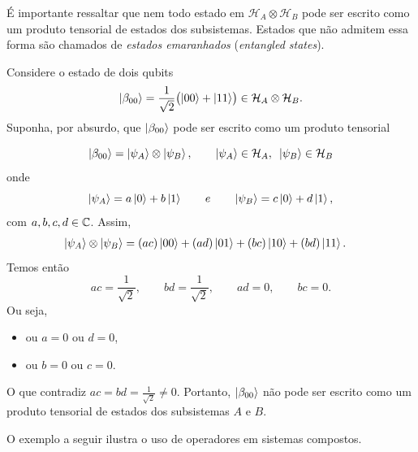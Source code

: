 É importante ressaltar que nem todo estado em $\mathcal{H}_A \otimes \mathcal{H}_B$ pode ser escrito como um
produto tensorial de estados dos subsistemas. Estados que não admitem essa forma
são chamados de \emph{estados emaranhados} (\emph{entangled states}).

\begin{example}
Considere o estado de dois qubits
\begin{equation}
\ket{\beta_{00}}=\frac{1}{\sqrt{2}}\bigl(\ket{00} + \ket{11}\bigr)
\in \mathcal{H}_A \otimes \mathcal{H}_B.
\end{equation}
Suponha, por absurdo, que $\ket{\beta_{00}}$ pode ser escrito como um produto tensorial

\begin{equation}
    \ket{\beta_{00}} = \ket{\psi_A} \otimes \ket{\psi_B}, \qquad \ket{\psi_A} \in \mathcal{H}_A, \text{ } \ket{\psi_B} \in \mathcal{H}_B
\end{equation}
onde
\begin{equation}
    \ket{\psi_A} = a\ket{0} + b\ket{1} \qquad e \qquad \ket{\psi_B} = c\ket{0} + d\ket{1},
\end{equation}
com $a,b,c,d \in \mathbb{C}$. Assim,
\begin{align}
    \ket{\psi_A} \otimes \ket{\psi_B}
    &= (ac)\ket{00} + (ad)\ket{01} + (bc)\ket{10} + (bd)\ket{11}.
\end{align}
Temos então
\begin{equation}
    ac = \frac{1}{\sqrt{2}}, \qquad bd = \frac{1}{\sqrt{2}}, \qquad ad = 0, \qquad bc = 0.    
\end{equation}
Ou seja,
\begin{itemize}
    \item ou $a=0$ ou $d=0$,
    \item ou $b=0$ ou $c=0$.
\end{itemize}
O que contradiz $ac=bd=\frac{1}{\sqrt{2}}\neq 0$. Portanto, $\ket{\beta_{00}}$ não pode ser escrito como um produto tensorial de estados dos subsistemas $A$ e $B$.
\end{example}

O exemplo a seguir ilustra o uso de operadores em sistemas compostos.

